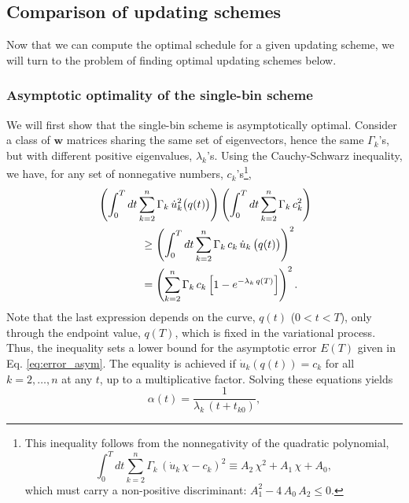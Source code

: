 \documentclass[reprint, superscriptaddress, floatfix]{revtex4-1}
\newcommand{\Err}{E}
\begin{document}
\subsection{\label{sec:cmpschemes}
Comparison of updating schemes}


Now that we can compute the optimal schedule
for a given updating scheme,
we will turn to the problem of finding
optimal updating schemes below.


\subsubsection{\label{sec:optWL}
Asymptotic optimality of the single-bin scheme}



We will first show
that the single-bin scheme is asymptotically optimal.
%
Consider a class of $\mathbf w$ matrices
sharing the same set of eigenvectors,
hence the same $\Gamma_k$'s,
but with different positive eigenvalues,
$\lambda_k$'s.
%
Using the Cauchy-Schwarz inequality, we have,
for any set of nonnegative numbers, $c_k$'s\footnote{This
inequality follows from the nonnegativity of
the quadratic polynomial,
$$
\int_0^T
  dt \sum_{k = 2}^n \Gamma_k \,
    \left( \dot u_k \, \chi - c_k \right)^2
  \equiv
  A_2 \, \chi^2 + A_1 \, \chi + A_0
  ,
$$
which must carry a non-positive discriminant:
$A_1^2 - 4 \, A_0 \, A_2 \le 0$.},
%
%
\begin{align}
&
\left(
  \int_0^T dt
    \sum_{k = 2}^n
      \Gamma_k \, \dot u_k^2\bigl( q(t) \bigr)
\right)
%
\left(
  \int_0^T dt
    \sum_{k = 2}^n
      \Gamma_k \, c_k^2
\right)
%
\notag
\\
&
\qquad \qquad
\ge
\left(
  \int_0^T dt
    \sum_{k = 2}^n
      \Gamma_k \, c_k \, \dot u_k \, \bigl( q(t) \bigr)
\right)^2
\notag
\\
&
\qquad \qquad
=
\left(
  \sum_{k = 2}^n \Gamma_k \, c_k
    \left[
      1 - e^{ -\lambda_k \, q(T) }
    \right]
\right)^2.
\label{eq:CSineq}
\end{align}
%
Note that the last expression %
depends on the curve, $q(t)$ ($0 < t < T$),
only through the endpoint value, $q(T)$,
which is fixed in the variational process.
%
Thus, the inequality sets a lower bound
for the asymptotic error $\Err(T)$
given in Eq. \eqref{eq:error_asym}.
%
The equality is achieved
if $\dot u_k\left( q(t) \right) = c_k$
for all $k = 2, \dots, n$ at any $t$,
up to a multiplicative factor.
%
Solving these equations yields
%
\begin{equation}
  \alpha(t) = \frac{              1             }
                   { \lambda_k \, (t + t_{k0} ) },
\label{eq:alpha_invtk}
\end{equation}
\end{document}

